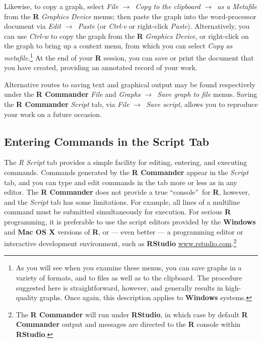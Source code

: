 \documentclass{article}%
\begin{document}
Likewise, to copy a graph, select \emph{File }$\longrightarrow$\emph{\ Copy to
the clipboard }$\longrightarrow$\emph{\ as a Metafile} from the \textbf{R}
\emph{Graphics Device} menus; then paste the graph into the word-processor
document via \emph{Edit }$\longrightarrow$\emph{\ Paste} (or \emph{Ctrl-v} or
right-click \emph{Paste}). Alternatively, you can use \emph{Ctrl-w} to copy
the graph from the \textbf{R} \emph{Graphics Device}, or right-click on the
graph to bring up a context menu, from which you can select \emph{Copy as
metafile}.\footnote{As you will see when you examine these menus, you can save
graphs in a variety of formats, and to files as well as to the clipboard. The
procedure suggested here is straightforward, however, and generally results in
high-quality graphs. Once again, this description applies to \textbf{Windows}
systems.} At the end of your \textbf{R} session, you can save or print the
document that you have created, providing an annotated record of your work.

Alternative routes to saving text and graphical output may be found
respectively under the \textbf{R Commander }\emph{File} and \emph{Graphs
}$\longrightarrow$\emph{\ Save graph to file} menus. Saving the \textbf{R
Commander} \emph{Script} tab, via \emph{File }$\longrightarrow$\emph{\ Save
script}, allows you to reproduce your work on a future occasion.

\subsection{Entering Commands in the Script Tab}

The \emph{R Script} tab provides a simple facility for editing, entering, and
executing commands. Commands generated by the \textbf{R Commander} appear in
the \emph{Script} tab, and you can type and edit commands in the tab more or
less as in any editor. The \textbf{R Commander} does not provide a true
\textquotedblleft console\textquotedblright\ for \textbf{R}, however, and the
\emph{Script} tab has some limitations. For example, all lines of a multiline
command must be submitted simultaneously for execution. For serious \textbf{R}
programming, it is preferable to use the script editors provided by the
\textbf{Windows} and \textbf{Mac OS X} versions of \textbf{R}, or --- even
better --- a programming editor or interactive development environment, such
as \textbf{RStudio} \href{https://www.rstudio.com/}{www.rstudio.com}.\footnote{
The \textbf{R Commander} will run under \textbf{RStudio}, in which
case by default \textbf{R Commander} output and messages are directed to the
\textbf{R} console within \textbf{RStudio}.}
\end{document}

